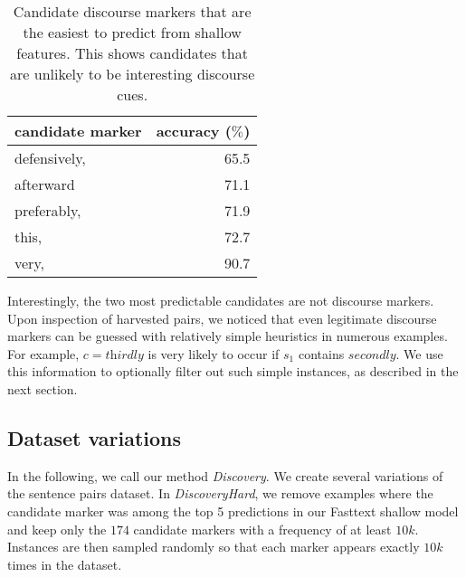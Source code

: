 \documentclass[11pt,a4paper]{article}
\begin{document}
\begin{table}[htb]
\begin{center}
\begin{tabular}{lr}
\toprule
    candidate marker &  accuracy  ($\%$)\\
\midrule
 defensively, &      65.5 \\
    afterward &      71.1 \\
  preferably, &      71.9 \\
        this, &      72.7 \\
        very, &      90.7 \\
\bottomrule
\end{tabular}
\end{center}
\caption{Candidate discourse markers that are the easiest to predict from shallow features. This shows candidates that are unlikely to be interesting discourse cues.}
\label{table:mostpredictable}
\end{table}

Interestingly, the two most predictable candidates are not discourse markers. Upon inspection of harvested pairs, we noticed that even legitimate discourse markers can be guessed with relatively simple heuristics in numerous examples.
For example, $c=\textit{thirdly}$ is very likely to occur if $s_1$ contains $\textit{secondly}$. 
We use this information to optionally filter out such simple instances, as described in the next section.


\subsection{Dataset variations}

In the following, we call our method \textit{Discovery}.
We create several variations of the sentence pairs dataset. In \textit{DiscoveryHard}, we remove examples where the candidate marker was among the top 5 predictions in our Fasttext shallow model and keep only the $174$ candidate markers with a frequency of at least $10k$. Instances are then sampled randomly so that each marker appears exactly $10k$ times in the dataset.
\end{document}
